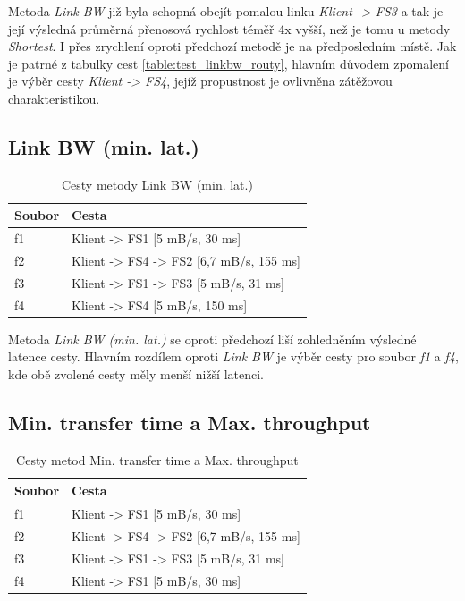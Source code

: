 \documentclass[czech,DP]{thesiskiv}
\begin{document}
Metoda \textit{Link BW} již byla schopná obejít pomalou linku \textit{Klient -> FS3} a tak je její výsledná průměrná přenosová rychlost téměř 4x vyšší, než je tomu u metody \textit{Shortest}. I přes zrychlení oproti předchozí metodě je na předposledním místě. Jak je patrné z tabulky cest \ref{table:test_linkbw_routy}, hlavním důvodem zpomalení je výběr cesty \textit{Klient -> FS4}, jejíž propustnost je ovlivněna zátěžovou charakteristikou.

\subsection{Link BW (min. lat.)}

\begin{table}[H]
\centering
\caption{Cesty metody Link BW (min. lat.)}
\begin{tabular}{|l|l|}
\hline
\textbf{Soubor} & \textbf{Cesta}           \\ \hline
f1              & Klient -> FS1 [5 mB/s, 30 ms]\\ \hline
f2              & Klient -> FS4 -> FS2 [6,7 mB/s, 155 ms]\\ \hline
f3              & Klient -> FS1 -> FS3 [5 mB/s, 31 ms]\\ \hline
f4              & Klient -> FS4 [5 mB/s, 150 ms]\\ \hline
\end{tabular}
\end{table}

Metoda \textit{Link BW (min. lat.)} se oproti předchozí liší zohledněním výsledné latence cesty. Hlavním rozdílem oproti \textit{Link BW} je výběr cesty pro soubor \textit{f1} a \textit{f4}, kde obě zvolené cesty měly menší nižší latenci.

\subsection{Min. transfer time a Max. throughput}

\begin{table}[H]
\centering
\caption{Cesty metod Min. transfer time a Max. throughput}
\begin{tabular}{|l|l|}
\hline
\textbf{Soubor} & \textbf{Cesta}           \\ \hline
f1              & Klient -> FS1 [5 mB/s, 30 ms]\\ \hline
f2              & Klient -> FS4 -> FS2 [6,7 mB/s, 155 ms]\\ \hline
f3              & Klient -> FS1 -> FS3 [5 mB/s, 31 ms]\\ \hline
f4              & Klient -> FS1 [5 mB/s, 30 ms]\\ \hline
\end{tabular}
\end{table}
\end{document}

